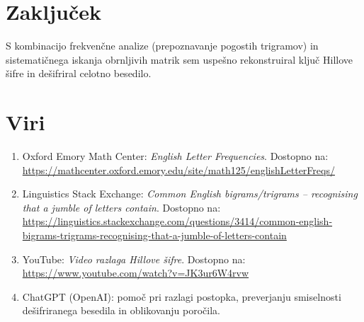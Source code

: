 \documentclass[12pt,a4paper]{article}
\begin{document}
\section{Zaključek}

S kombinacijo frekvenčne analize (prepoznavanje pogostih trigramov) in sistematičnega iskanja obrnljivih matrik sem uspešno rekonstruiral ključ Hillove šifre in dešifriral celotno besedilo.

\section{Viri}

\begin{enumerate}
\item Oxford Emory Math Center: \emph{English Letter Frequencies}. Dostopno na: \url{https://mathcenter.oxford.emory.edu/site/math125/englishLetterFreqs/}

\item Linguistics Stack Exchange: \emph{Common English bigrams/trigrams -- recognising that a jumble of letters contain}. Dostopno na: \url{https://linguistics.stackexchange.com/questions/3414/common-english-bigrams-trigrams-recognising-that-a-jumble-of-letters-contain}

\item YouTube: \emph{Video razlaga Hillove šifre}. Dostopno na: \url{https://www.youtube.com/watch?v=JK3ur6W4rvw}

\item ChatGPT (OpenAI): pomoč pri razlagi postopka, preverjanju smiselnosti dešifriranega besedila in oblikovanju poročila.
\end{enumerate}
\end{document}
